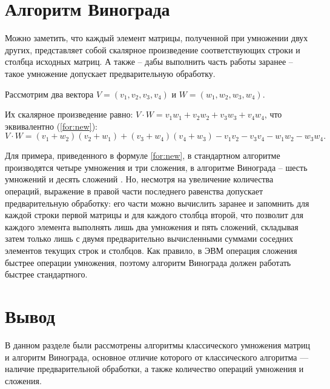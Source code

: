 \section{Алгоритм Винограда}

Можно заметить, что каждый элемент матрицы, полученной при умножении двух других, представляет собой скалярное произведение соответствующих строки и столбца исходных матриц. А также -- дабы выполнить часть работы заранее --  такое умножение допускает предварительную обработку.

Рассмотрим два вектора $V = (v_1, v_2, v_3, v_4)$ и $W = (w_1, w_2, w_3, w_4)$.

Их скалярное произведение равно: $V \cdot W = v_1w_1 + v_2w_2 + v_3w_3 + v_4w_4$, что эквивалентно (\ref{for:new}):
\begin{equation}
	\label{for:new}
		V \cdot W = (v_1 + w_2) (v_2 + w_1) + (v_3 + w_4)(v_4 + w_3) - v_1v_2 - v_3v_4 - w_1w_2 - w_3w_4.
\end{equation}

Для примера, приведенного в формуле \ref{for:new}, в стандартном алгоритме производятся четыре умножения и три сложения, в алгоритме Винограда -- шесть умножений и десять сложений \cite{vin}. Но, несмотря на увеличение количества операций, выражение в правой части последнего равенства допускает предварительную обработку: его части можно вычислить заранее и запомнить для каждой строки первой матрицы и для каждого столбца второй, что позволит для каждого элемента выполнять лишь два умножения и пять сложений, складывая затем только лишь с двумя предварительно вычисленными суммами соседних элементов текущих строк и столбцов. Как правило, в ЭВМ операция сложения быстрее операции умножения, поэтому алгоритм Винограда должен работать быстрее стандартного.

\section{Вывод}
	В данном разделе были рассмотрены алгоритмы классического умножения матриц и алгоритм Винограда, основное отличие которого от классического алгоритма — наличие предварительной обработки, а также количество операций умножения и сложения. 
\clearpage